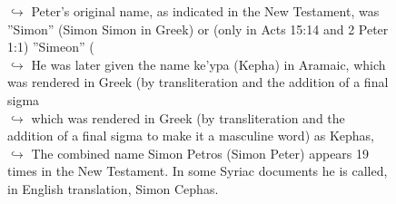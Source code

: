 \documentclass[11pt,a4paper, onecolumn]{article}
\begin{document}
\begin{figure}[t] \small \begin{tcolorbox}[boxsep=0pt,left=5pt,right=0pt,top=2pt,colback = yellow!5] \begin{dialogue}
 \small 
\colorbox{pink!25}{$\hookrightarrow$}
{ Peter's original name, as indicated in the New Testament, was ''Simon'' (Simon Simon in Greek) or (only in Acts 15:14 and 2 Peter 1:1) ''Simeon'' ( }
\\
\colorbox{pink!25}{$\hookrightarrow$}
{ He was later given the name ke'ypa (Kepha) in Aramaic, which was rendered in Greek (by transliteration and the addition of a final sigma }
\\
\colorbox{pink!25}{$\hookrightarrow$}
{ which was rendered in Greek (by transliteration and the addition of a final sigma to make it a masculine word) as Kephas, }
\\
\colorbox{pink!25}{$\hookrightarrow$}
{ The combined name Simon Petros (Simon Peter) appears 19 times in the New Testament. In some Syriac documents he is called, in English translation, Simon Cephas. }
\\
 \end{dialogue}\end{tcolorbox}\end{figure}
\end{document}
